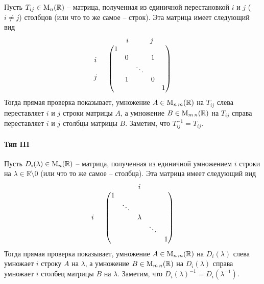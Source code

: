Пусть $T_{ij}\in\operatorname{M}_{n}(\mathbb R)$ -- матрица, полученная из единичной перестановкой $i$ и $j$ ($i\neq j$) столбцов (или что то же самое -- строк).
Эта матрица имеет следующий вид
\[
\begin{tabular}{cc}
{}&{$i$\quad \quad\quad $j$}\\
{
$
\begin{matrix}
{}\\{i}\\{}\\{j}\\{}
\end{matrix}
$}&{
$
\begin{pmatrix}
{1}&{}&{}&{}&{}\\
{}&{0}&{}&{1}&{}\\
{}&{}&{\ddots}&{}&{}\\
{}&{1}&{}&{0}&{}\\
{}&{}&{}&{}&{1}\\
\end{pmatrix}
$
}
\end{tabular}
\]
Тогда прямая проверка показывает, умножение $A\in\operatorname{M}_{n\,m}(\mathbb R)$ на $T_{ij}$ слева переставляет $i$ и $j$ строки матрицы $A$, а умножение $B\in\operatorname{M}_{m\,n}(\mathbb R)$ на $T_{ij}$ справа переставляет $i$ и $j$ столбцы матрицы $B$.
Заметим, что $T_{ij}^{-1} = T_{ij}$.


\paragraph{Тип III}

Пусть $D_i(\lambda)\in\operatorname{M}_{n}(\mathbb R)$ -- матрица, полученная из единичной умножением $i$ строки на $\lambda\in\mathbb R\setminus 0$ (или что то же самое -- столбца).
Эта матрица имеет следующий вид
\[
\begin{tabular}{cc}
{}&{$i$}\\
{
$
\begin{matrix}
{}\\{}\\{i}\\{}\\{}
\end{matrix}
$}&{
$
\begin{pmatrix}
{1}&{}&{}&{}&{}\\
{}&{\ddots}&{}&{}&{}\\
{}&{}&{\lambda}&{}&{}\\
{}&{}&{}&{\ddots}&{}\\
{}&{}&{}&{}&{1}\\
\end{pmatrix}
$
}
\end{tabular}
\]
Тогда прямая проверка показывает, умножение $A\in\operatorname{M}_{n\,m}(\mathbb R)$ на $D_i(\lambda)$ слева умножает $i$ строку $A$ на $\lambda$, а умножение $B\in\operatorname{M}_{m\,n}(\mathbb R)$ на $D_i(\lambda)$ справа умножает $i$ столбец матрицы $B$ на $\lambda$.
Заметим, что $D_i(\lambda)^{-1}= D_i(\lambda^{-1})$.

